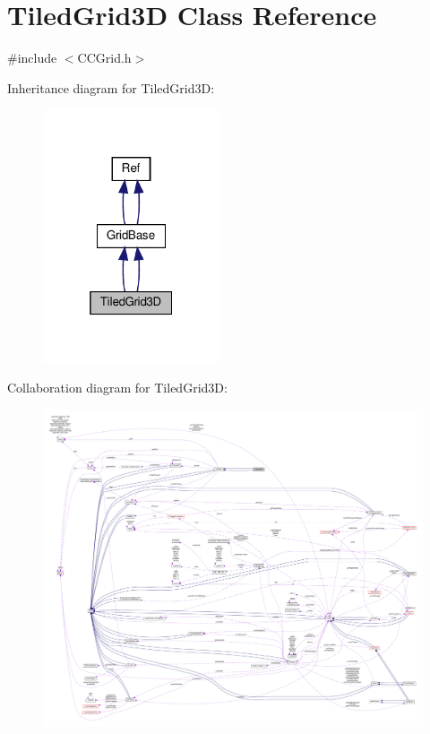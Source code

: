 \hypertarget{classTiledGrid3D}{}\section{Tiled\+Grid3D Class Reference}
\label{classTiledGrid3D}


{\ttfamily \#include $<$C\+C\+Grid.\+h$>$}



Inheritance diagram for Tiled\+Grid3D\+:
\nopagebreak
\begin{figure}[H]
\begin{center}
\leavevmode
\includegraphics[width=148pt]{classTiledGrid3D__inherit__graph}
\end{center}
\end{figure}


Collaboration diagram for Tiled\+Grid3D\+:
\nopagebreak
\begin{figure}[H]
\begin{center}
\leavevmode
\includegraphics[width=350pt]{classTiledGrid3D__coll__graph}
\end{center}
\end{figure}
